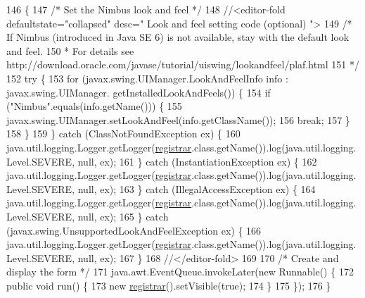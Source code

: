 \begin{DoxyCode}
146                                            \{
147         \textcolor{comment}{/* Set the Nimbus look and feel */}
148         \textcolor{comment}{//<editor-fold defaultstate="collapsed" desc=" Look and feel setting code (optional) ">}
149         \textcolor{comment}{/* If Nimbus (introduced in Java SE 6) is not available, stay with the default look and feel.}
150 \textcolor{comment}{         * For details see http://download.oracle.com/javase/tutorial/uiswing/lookandfeel/plaf.html }
151 \textcolor{comment}{         */}
152         \textcolor{keywordflow}{try} \{
153             \textcolor{keywordflow}{for} (javax.swing.UIManager.LookAndFeelInfo info : javax.swing.UIManager.
      getInstalledLookAndFeels()) \{
154                 \textcolor{keywordflow}{if} (\textcolor{stringliteral}{"Nimbus"}.equals(info.getName())) \{
155                     javax.swing.UIManager.setLookAndFeel(info.getClassName());
156                     \textcolor{keywordflow}{break};
157                 \}
158             \}
159         \} \textcolor{keywordflow}{catch} (ClassNotFoundException ex) \{
160             java.util.logging.Logger.getLogger(\mbox{\hyperlink{classsoftware_1_1registrar_a0960abe4e8b2d8f5a2c945ce37b280db}{registrar}}.class.getName()).log(java.util.logging.
      Level.SEVERE, null, ex);
161         \} \textcolor{keywordflow}{catch} (InstantiationException ex) \{
162             java.util.logging.Logger.getLogger(\mbox{\hyperlink{classsoftware_1_1registrar_a0960abe4e8b2d8f5a2c945ce37b280db}{registrar}}.class.getName()).log(java.util.logging.
      Level.SEVERE, null, ex);
163         \} \textcolor{keywordflow}{catch} (IllegalAccessException ex) \{
164             java.util.logging.Logger.getLogger(\mbox{\hyperlink{classsoftware_1_1registrar_a0960abe4e8b2d8f5a2c945ce37b280db}{registrar}}.class.getName()).log(java.util.logging.
      Level.SEVERE, null, ex);
165         \} \textcolor{keywordflow}{catch} (javax.swing.UnsupportedLookAndFeelException ex) \{
166             java.util.logging.Logger.getLogger(\mbox{\hyperlink{classsoftware_1_1registrar_a0960abe4e8b2d8f5a2c945ce37b280db}{registrar}}.class.getName()).log(java.util.logging.
      Level.SEVERE, null, ex);
167         \}
168         \textcolor{comment}{//</editor-fold>}
169 
170         \textcolor{comment}{/* Create and display the form */}
171         java.awt.EventQueue.invokeLater(\textcolor{keyword}{new} Runnable() \{
172             \textcolor{keyword}{public} \textcolor{keywordtype}{void} run() \{
173                 \textcolor{keyword}{new} \mbox{\hyperlink{classsoftware_1_1registrar_a0960abe4e8b2d8f5a2c945ce37b280db}{registrar}}().setVisible(\textcolor{keyword}{true});
174             \}
175         \});
176     \}
\end{DoxyCode}


